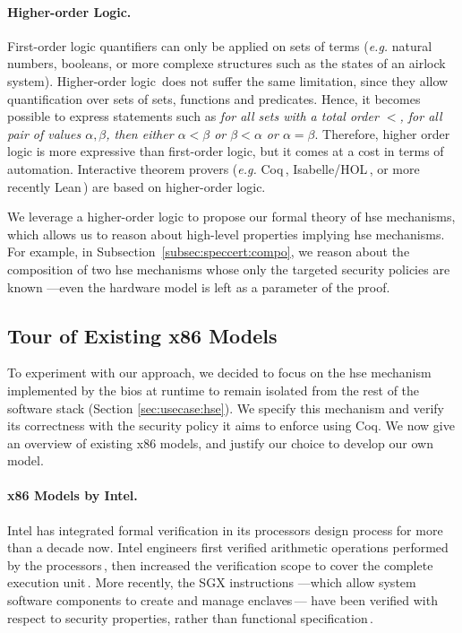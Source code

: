 \paragraph{Higher-order Logic.}
%
First-order logic quantifiers can only be applied on sets of terms (\emph{e.g.}
natural numbers, booleans, or more complexe structures such as the states of an
airlock system).
%
Higher-order logic\,\cite{leivant1994hol} does not suffer the same limitation,
since they allow quantification over sets of sets, functions and predicates.
%
Hence, it becomes possible to express statements such as \emph{for all sets with
  a total order \( < \), for all pair of values \( \alpha, \beta \), then either
  \( \alpha < \beta \) or \( \beta < \alpha \) or \( \alpha = \beta \)}.
%
Therefore, higher order logic is more expressive than first-order logic, but it
comes at a cost in terms of automation.
%
Interactive theorem provers (\emph{e.g.}  Coq\,\cite{coq},
Isabelle/HOL\,\cite{nipkow2002isabelle}, or more recently
Lean\,\cite{de2015lean}) are based on higher-order logic.

We leverage a higher-order logic to propose our formal theory of \ac{hse}
mechanisms, which allows us to reason about high-level properties implying
\ac{hse} mechanisms.
%
For example, in Subsection~\ref{subsec:speccert:compo}, we reason about the
composition of two \ac{hse} mechanisms whose only the targeted security policies
are known ---even the hardware model is left as a parameter of the proof.


\subsection{Tour of Existing x86 Models}
\label{subsec:sota:ltsrelated}

To experiment with our approach, we decided to focus on the \ac{hse} mechanism
implemented by the \ac{bios} at runtime to remain isolated from the rest of the
software stack (Section \ref{sec:usecase:hse}). We specify this mechanism and
verify its correctness with the security policy it aims to enforce using Coq.
%
We now give an overview of existing x86 models, and justify our choice to
develop our own model.

\paragraph{x86 Models by Intel.}
%
Intel has integrated formal verification in its processors design process for
more than a decade now.
%
Intel engineers first verified arithmetic operations performed by the
processors\,\cite{harrison2000x86}, then increased the verification scope to
cover the complete execution unit\,\cite{kaivola2009formalintel}.
%
More recently, the SGX instructions ---which allow system software components to
create and manage enclaves\,\cite{costan2016sgxexplained}--- have been verified
with respect to security properties, rather than functional
specification\,\cite{leslie2015linsgx}.
%

